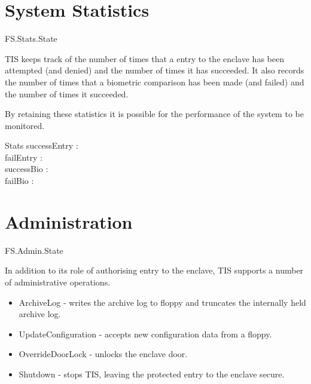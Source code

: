 \section{System Statistics}

\begin{traceunit}{FS.Stats.State}
\end{traceunit}


TIS keeps track of the number of times that a entry to the
enclave has been attempted (and denied) and the number of times it has succeeded. It
also records the number of times that a biometric comparison has been
made (and failed) and the number of times it succeeded.

By retaining these statistics it is possible for the performance of
the system to be monitored.

\begin{lateschema}{Stats} 
        successEntry : \nat
\\      failEntry : \nat
\\      successBio : \nat
\\      failBio : \nat
\end{lateschema}

\section{Administration}

\begin{traceunit}{FS.Admin.State}
\end{traceunit}

In addition to its role of authorising entry to the enclave, TIS 
supports a number of administrative operations. 

\begin{itemize}
\item ArchiveLog - writes the archive log to floppy and truncates the
internally held archive log.
\item UpdateConfiguration - accepts new configuration data from a floppy. 
\item OverrideDoorLock - unlocks the enclave door. 
\item Shutdown - stops TIS, leaving the protected entry to the enclave secure.
\end{itemize}

